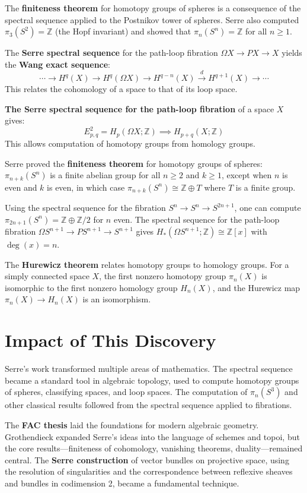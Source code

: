 The \textbf{finiteness theorem} for homotopy groups of spheres is a consequence of the spectral sequence applied to the Postnikov tower of spheres. Serre also computed $\pi_3(S^2) = \mathbb{Z}$ (the Hopf invariant) and showed that $\pi_n(S^n) = \mathbb{Z}$ for all $n \geq 1$.

The \textbf{Serre spectral sequence} for the path-loop fibration $\Omega X \to PX \to X$ yields the \textbf{Wang exact sequence}:
\[\cdots \to H^q(X) \to H^q(\Omega X) \to H^{q-n}(X) \xrightarrow{d} H^{q+1}(X) \to \cdots\]
This relates the cohomology of a space to that of its loop space.

\textbf{The Serre spectral sequence for the path-loop fibration} of a space $X$ gives:
\[E^2_{p,q} = H_p(\Omega X; \mathbb{Z}) \implies H_{p+q}(X; \mathbb{Z})\]
This allows computation of homotopy groups from homology groups.

Serre proved the \textbf{finiteness theorem} for homotopy groups of spheres: $\pi_{n+k}(S^n)$ is a finite abelian group for all $n \geq 2$ and $k \geq 1$, except when $n$ is even and $k$ is even, in which case $\pi_{n+k}(S^n) \cong \mathbb{Z} \oplus T$ where $T$ is a finite group.

Using the spectral sequence for the fibration $S^n \to S^n \to S^{2n+1}$, one can compute $\pi_{2n+1}(S^n) = \mathbb{Z} \oplus \mathbb{Z}/2$ for $n$ even. The spectral sequence for the path-loop fibration $\Omega S^{n+1} \to PS^{n+1} \to S^{n+1}$ gives $H_*(\Omega S^{n+1}; \mathbb{Z}) \cong \mathbb{Z}[x]$ with $\deg(x) = n$.

The \textbf{Hurewicz theorem} relates homotopy groups to homology groups. For a simply connected space $X$, the first nonzero homotopy group $\pi_n(X)$ is isomorphic to the first nonzero homology group $H_n(X)$, and the Hurewicz map $\pi_n(X) \to H_n(X)$ is an isomorphism.

\section{Impact of This Discovery}

Serre's work transformed multiple areas of mathematics. The spectral sequence became a standard tool in algebraic topology, used to compute homotopy groups of spheres, classifying spaces, and loop spaces. The computation of $\pi_n(S^3)$ and other classical results followed from the spectral sequence applied to fibrations.

The \textbf{FAC thesis} laid the foundations for modern algebraic geometry. Grothendieck expanded Serre's ideas into the language of schemes and topoi, but the core results---finiteness of cohomology, vanishing theorems, duality---remained central. The \textbf{Serre construction} of vector bundles on projective space, using the resolution of singularities and the correspondence between reflexive sheaves and bundles in codimension 2, became a fundamental technique.

